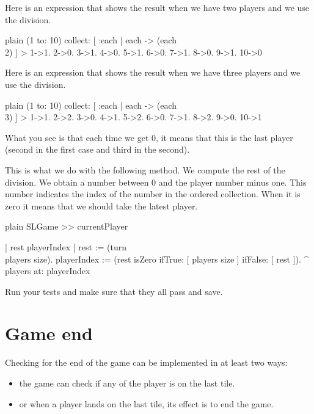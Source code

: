 \documentclass[10pt,twoside,english]{_support/latex/sbabook/sbabook}
\begin{document}
Here is an expression that shows the result when we have two players and we use the division. 

\begin{displaycode}{plain}
(1 to: 10) collect: [ :each | each -> (each \\ 2) ] 
> {1->1. 2->0. 3->1. 4->0. 5->1. 6->0. 7->1. 8->0. 9->1. 10->0}
\end{displaycode}

Here is an expression that shows the result when we have three players and we use the division. 

\begin{displaycode}{plain}
(1 to: 10) collect: [ :each | each -> (each \\ 3) ] 
> {1->1. 2->2. 3->0. 4->1. 5->2. 6->0. 7->1. 8->2. 9->0. 10->1}
\end{displaycode}

What you see is that each time we get 0, it means that this is the last player (second in the first case and third in the second).

This is what we do with the following method. We compute the rest of the division. 
We obtain a number between 0 and the player number minus one. This number indicates the index of the number in the  ordered collection. When it is zero it means that we should take the latest player. 

\begin{displaycode}{plain}
SLGame >> currentPlayer

	| rest playerIndex |
	rest := (turn \\ players size).
	playerIndex := (rest isZero
					ifTrue: [ players size ]
					ifFalse: [ rest ]).
	^ players at: 	playerIndex
\end{displaycode}

Run your tests and make sure that they all pass and save.
\section{Game end}
Checking for the end of the game can be implemented in at least two ways: 

\begin{itemize}
\item the game can check if any of the player is on the last tile.
\item or when a player lands on the last tile, its effect is to end the game. 
\end{itemize}
\end{document}

